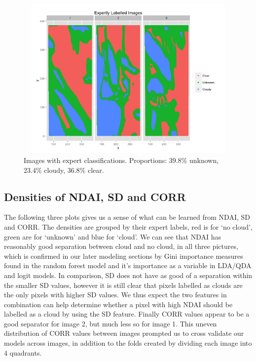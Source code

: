 \documentclass{article}\usepackage[]{graphicx}\usepackage[]{color}
\begin{document}
\begin{figure}[H]
\includegraphics[width = 18cm, height=8cm]{EXPERTSEDA.png}
\caption{Images with expert classifications. Proportions: 39.8$\%$ unknown, 23.4$\%$ cloudy, 36.8$\%$ clear.}
\end{figure}
\subsection{Densities of NDAI, SD and CORR}

The following three plots gives us a sense of what can be learned from NDAI, SD and CORR.  The densities are grouped by their expert labels, red is for `no cloud', green are for `unknown' and blue for `cloud'. We can see that NDAI has reasonably good separation between cloud and no cloud, in all three pictures, which is confirmed in our later modeling sections by Gini importance measures found in the random forest model and it's importance as a variable in LDA/QDA and logit models. In comparison, SD does not have as  good of a separation within the smaller SD values, however it is still clear that pixels labelled as clouds are the only pixels with higher SD values.  We thus expect the two features in combination can help determine whether a pixel with high NDAI should be labelled as a cloud by using the SD feature.  Finally CORR values appear to be a good separator for image 2, but much less so for image 1.  This uneven distribution of CORR values between images prompted us to cross validate our models across images, in addition to the folds created by dividing each image into 4 quadrants. 
\end{document}
